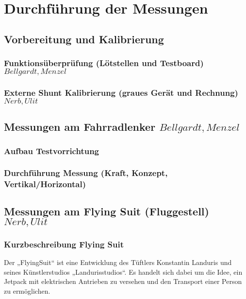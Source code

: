 \chapter{Durchf\"uhrung der Messungen}

\section{Vorbereitung und Kalibrierung}
\subsection{Funktions\"uberpr\"ufung (L\"otstellen und Testboard) \(Bellgardt, Menzel\)}


\subsection{Externe Shunt Kalibrierung (graues Ger\"at und Rechnung) \(Nerb, Ulit\)}

\section{Messungen am Fahrradlenker \(Bellgardt, Menzel\)}
\subsection{Aufbau Testvorrichtung}
\subsection{Durchf\"uhrung Messung (Kraft, Konzept, Vertikal/Horizontal)}

\clearpage
\section{Messungen am Flying Suit (Fluggestell) \(Nerb, Ulit\)}
\subsection{Kurzbeschreibung Flying Suit}
Der „FlyingSuit“ ist eine Entwicklung des Tüftlers Konstantin Landuris und seines Künstlerstudios „Landurisstudios“.
Es handelt sich dabei um die Idee, ein Jetpack mit elektrischen Antrieben zu versehen und den Transport einer Person zu ermöglichen.

